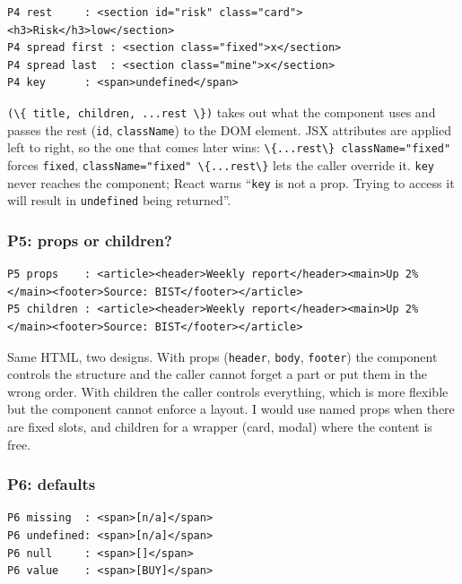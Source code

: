 \documentclass[
  11pt,
]{article}
\newcommand{\passthrough}[1]{#1}
\begin{document}
\begin{lstlisting}
P4 rest     : <section id="risk" class="card"><h3>Risk</h3>low</section>
P4 spread first : <section class="fixed">x</section>
P4 spread last  : <section class="mine">x</section>
P4 key      : <span>undefined</span>
\end{lstlisting}

\passthrough{\lstinline!(\{ title, children, ...rest \})!} takes out
what the component uses and passes the rest
(\passthrough{\lstinline!id!}, \passthrough{\lstinline!className!}) to
the DOM element. JSX attributes are applied left to right, so the one
that comes later wins:
\passthrough{\lstinline!\{...rest\} className="fixed"!} forces
\passthrough{\lstinline!fixed!},
\passthrough{\lstinline!className="fixed" \{...rest\}!} lets the caller
override it. \passthrough{\lstinline!key!} never reaches the component;
React warns ``\passthrough{\lstinline!key!} is not a prop. Trying to
access it will result in \passthrough{\lstinline!undefined!} being
returned''.

\subsubsection{P5: props or children?}\label{p5-props-or-children}

\begin{lstlisting}
P5 props    : <article><header>Weekly report</header><main>Up 2%</main><footer>Source: BIST</footer></article>
P5 children : <article><header>Weekly report</header><main>Up 2%</main><footer>Source: BIST</footer></article>
\end{lstlisting}

Same HTML, two designs. With props (\passthrough{\lstinline!header!},
\passthrough{\lstinline!body!}, \passthrough{\lstinline!footer!}) the
component controls the structure and the caller cannot forget a part or
put them in the wrong order. With children the caller controls
everything, which is more flexible but the component cannot enforce a
layout. I would use named props when there are fixed slots, and children
for a wrapper (card, modal) where the content is free.

\subsubsection{P6: defaults}\label{p6-defaults}

\begin{lstlisting}
P6 missing  : <span>[n/a]</span>
P6 undefined: <span>[n/a]</span>
P6 null     : <span>[]</span>
P6 value    : <span>[BUY]</span>
\end{lstlisting}
\end{document}
